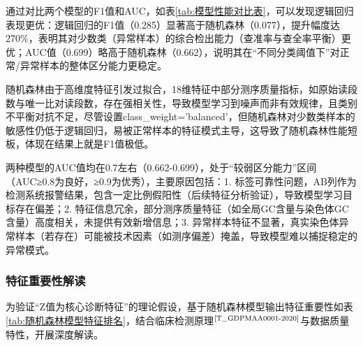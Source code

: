 \documentclass[withoutpreface,bwprint]{cumcmthesis} %
\begin{document}
通过对比两个模型的F1值和AUC，如表\ref{tab:模型性能对比表}，可以发现逻辑回归表现更优：逻辑回归的F1值（0.285）显著高于随机森林（0.077），提升幅度达270\%，表明其对少数类（异常样本）的综合检出能力（查准率与查全率平衡）更优；AUC值（0.699）略高于随机森林（0.662），说明其在“不同分类阈值下”对正常/异常样本的整体区分能力更稳定。  

随机森林由于高维度特征引发过拟合，18维特征中部分测序质量指标，如原始读段数与唯一比对读段数，存在强相关性，导致模型学习到噪声而非有效规律，且类别不平衡对抗不足，尽管设置class\_weight='balanced'，但随机森林对少数类样本的敏感性仍低于逻辑回归，易被正常样本的特征模式主导，这导致了随机森林性能短板，体现在结果上就是F1值极低。

两种模型的AUC值均在0.7左右（0.662-0.699），处于“较弱区分能力”区间（AUC≥0.8为良好，≥0.9为优秀），主要原因包括：1. 标签可靠性问题，AB列作为检测系统报警结果，包含一定比例假阳性（后续特征分析验证），导致模型学习目标存在偏差；2. 特征信息冗余，部分测序质量特征（如全局GC含量与染色体GC含量）高度相关，未提供有效新增信息；3. 异常样本特征不显著，真实染色体异常样本（若存在）可能被技术因素（如测序偏差）掩盖，导致模型难以捕捉稳定的异常模式。


\subsubsection{特征重要性解读}
为验证“Z值为核心诊断特征”的理论假设，基于随机森林模型输出特征重要性如表\ref{tab:随机森林模型特征排名}，结合临床检测原理$^\text{\cite{T_GDPMAA0001-2020}}$与数据质量特性，开展深度解读。
\end{document}
